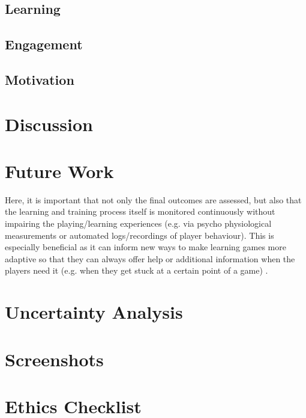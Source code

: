 \documentclass[a4paper,11.5pt]{report}
\numberwithin{figure}{section}
\numberwithin{table}{section}
\numberwithin{equation}{section}
\numberwithin{equation}{section}
\newcommand\blankpage{%
    \null
    \thispagestyle{empty}%
    \addtocounter{page}{-1}%
    \newpage}
\begin{document}
\section{Learning}

\section{Engagement}

\section{Motivation}




\afterpage{\blankpage}



\chapter{Discussion}
\afterpage{\blankpage}



\chapter{Future Work}

Here, it is important that not only the final outcomes are assessed, but also that the learning and training process itself is monitored continuously without impairing the playing/learning experiences (e.g. via psycho physiological measurements or automated logs/recordings of player behaviour). This is especially beneficial as it can inform new ways to make learning games more adaptive so that they can always offer help or additional information when the players need it (e.g. when they get stuck at a certain point of a game) \citep{Breuer2010}.

\afterpage{\blankpage}





\appendix
{}
\appendixpage

\renewcommand\chaptername{Appendix}

\newpage
\chapter{Uncertainty Analysis} \label{app:errors}

\chapter{Screenshots} \label{app:screenshots}

\chapter{Ethics Checklist} \label{app:ethicschecklist}
\end{document}
